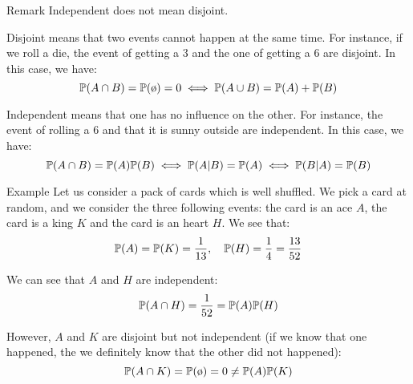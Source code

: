\documentclass[a4paper]{article}
\begin{document}
\begin{parag}{Remark}
    Independent does not mean disjoint. 

    Disjoint means that two events cannot happen at the same time. For instance, if we roll a die, the event of getting a 3 and the one of getting a 6 are disjoint. In this case, we have: 
    \[\prob\left(A \cap B\right) = \prob\left(\o\right) = 0 \iff \prob\left(A \cup B\right) = \prob\left(A\right) + \prob\left(B\right)\]

    Independent means that one has no influence on the other. For instance, the event of rolling a 6 and that it is sunny outside are independent. In this case, we have: 
    \[\prob\left(A \cap B\right) = \prob\left(A\right) \prob\left(B\right) \iff \prob\left(A|B\right) = \prob\left(A\right) \iff \prob\left(B|A\right) = \prob\left(B\right)\]
\end{parag}

\begin{parag}{Example}
    Let us consider a pack of cards which is well shuffled. We pick a card at random, and we consider the three following events: the card is an ace $A$, the card is a king $K$ and the card is an heart $H$. We see that: 
    \[\prob\left(A\right) = \prob\left(K\right) = \frac{1}{13}, \mathspace \prob\left(H\right) = \frac{1}{4} = \frac{13}{52}\]
    

    We can see that $A$ and $H$ are independent: 
    \[\prob\left(A \cap H\right) = \frac{1}{52} = \prob\left(A\right)\prob\left(H\right)\]
    
    However, $A$ and $K$ are disjoint but not independent (if we know that one happened, the we definitely know that the other did not happened): 
    \[\prob\left(A \cap K\right) = \prob\left(\o\right) = 0 \neq \prob\left(A\right)\prob\left(K\right)\]
\end{parag}
\end{document}
